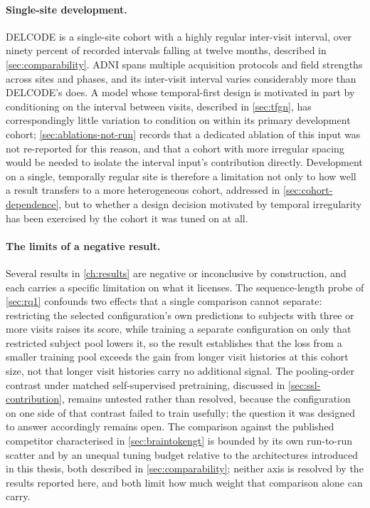 \paragraph{Single-site development.} \ac{DELCODE} is a single-site cohort with a highly
regular inter-visit interval, over ninety percent of recorded intervals falling at twelve
months, described in \autoref{sec:comparability}. \ac{ADNI} spans multiple acquisition
protocols and field strengths across sites and phases, and its inter-visit interval varies
considerably more than \ac{DELCODE}'s does. A model whose temporal-first design is
motivated in part by conditioning on the interval between visits, described in
\autoref{sec:tfgn}, has correspondingly little variation to condition on within its primary
development cohort; \autoref{sec:ablations-not-run} records that a dedicated ablation of
this input was not re-reported for this reason, and that a cohort with more irregular
spacing would be needed to isolate the interval input's contribution directly. Development
on a single, temporally regular site is therefore a limitation not only to how well a result
transfers to a more heterogeneous cohort, addressed in \autoref{sec:cohort-dependence}, but
to whether a design decision motivated by temporal irregularity has been exercised by the
cohort it was tuned on at all.

\paragraph{The limits of a negative result.} Several results in \autoref{ch:results} are
negative or inconclusive by construction, and each carries a specific limitation on what it
licenses. The sequence-length probe of \autoref{sec:rq1} confounds two effects that a single
comparison cannot separate: restricting the selected configuration's own predictions to
subjects with three or more visits raises its score, while training a separate configuration
on only that restricted subject pool lowers it, so the result establishes that the loss from
a smaller training pool exceeds the gain from longer visit histories at this cohort size,
not that longer visit histories carry no additional signal. The pooling-order contrast
under matched self-supervised pretraining, discussed in \autoref{sec:ssl-contribution},
remains untested rather than resolved, because the configuration on one side of that
contrast failed to train usefully; the question it was designed to answer accordingly
remains open. The comparison against the published competitor characterised in
\autoref{sec:braintokengt} is bounded by its own run-to-run scatter and by an unequal tuning
budget relative to the architectures introduced in this thesis, both described in
\autoref{sec:comparability}; neither axis is resolved by the results reported here, and both
limit how much weight that comparison alone can carry.


